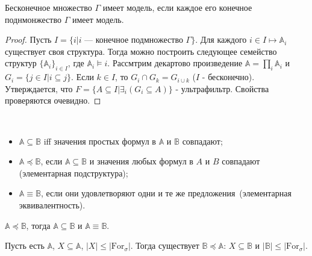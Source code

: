 \begin{theorem}
    Бесконечное множество $\Gamma$ имеет модель, если каждое его конечное поднмонжество $\Gamma$ имеет модель.
\end{theorem}  

\begin{proof}
    Пусть $I = \{i | i \text{~— конечное подмножество } \Gamma\}$. Для каждого $i \in I \mapsto \mathbb{A}_i$ существует своя структура. Тогда можно построить следующее семейство структур $\{\mathbb{A}_i\}_{i \in I}$, где $\mathbb{A}_i \models i$. Рассмтрим декартово произведение $\mathbb{A} = \prod_i \mathbb{A}_i$ и $G_i = \{j \in I | i \subseteq j\}$. Если $k \in I$, то $G_i \cap G_k = G_{i \cup k}$ ($I$ - бесконечно). Утверждается, что $F = \{A \subseteq I | \exists_i (G_i \subseteq A)\}$ - ультрафильтр. Свойства проверяются очевидно. 
\end{proof}

\begin{definition} \ 
    
    \begin{itemize}
        \item $\mathbb{A} \subseteq \mathbb{B}$ iff значения простых формул в $\mathbb{A}$ и $\mathbb{B}$ совпадают; 
        \item $\mathbb{A} \preceq \mathbb{B}$, если $\mathbb{A} \subseteq \mathbb{B}$ и значения любых формул в $A$ и $B$ совпадают (элементарная подструктура); 
        \item $\mathbb{A} \equiv \mathbb{B}$, если они удовлетворяют одни и те же предложения (элементарная эквивалентность).
    \end{itemize}
\end{definition}

\begin{stat}
    $\mathbb{A} \preceq \mathbb{B}$, тогда $\mathbb{A} \subseteq \mathbb{B}$ и $\mathbb{A} \equiv \mathbb{B}$. 
\end{stat}

\begin{theorem}
    Пусть есть $\mathbb{A}$, $X \subseteq \mathbb{A}$, $|X| \leq |\text{For}_\sigma|$. Тогда существует $\mathbb{B} \preceq \mathbb{A}$: $X \subseteq \mathbb{B}$ и $|\mathbb{B}| \leq |\text{For}_\sigma|$. 
\end{theorem}